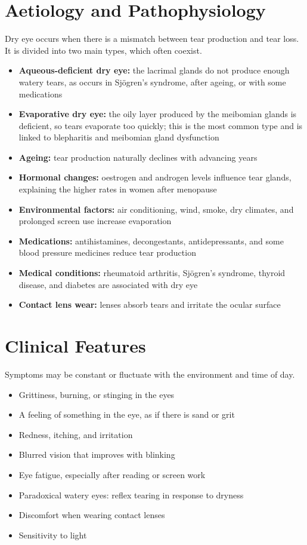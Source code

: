 \section*{Aetiology and Pathophysiology}
Dry eye occurs when there is a mismatch between tear production and tear loss. It is divided into two main types, which often coexist.
\begin{itemize}
    \item \textbf{Aqueous-deficient dry eye:} the lacrimal glands do not produce enough watery tears, as occurs in Sjögren's syndrome, after ageing, or with some medications
    \item \textbf{Evaporative dry eye:} the oily layer produced by the meibomian glands is deficient, so tears evaporate too quickly; this is the most common type and is linked to blepharitis and meibomian gland dysfunction
    \item \textbf{Ageing:} tear production naturally declines with advancing years
    \item \textbf{Hormonal changes:} oestrogen and androgen levels influence tear glands, explaining the higher rates in women after menopause
    \item \textbf{Environmental factors:} air conditioning, wind, smoke, dry climates, and prolonged screen use increase evaporation
    \item \textbf{Medications:} antihistamines, decongestants, antidepressants, and some blood pressure medicines reduce tear production
    \item \textbf{Medical conditions:} rheumatoid arthritis, Sjögren's syndrome, thyroid disease, and diabetes are associated with dry eye
    \item \textbf{Contact lens wear:} lenses absorb tears and irritate the ocular surface
\end{itemize}

\section*{Clinical Features}
Symptoms may be constant or fluctuate with the environment and time of day.
\begin{itemize}
    \item Grittiness, burning, or stinging in the eyes
    \item A feeling of something in the eye, as if there is sand or grit
    \item Redness, itching, and irritation
    \item Blurred vision that improves with blinking
    \item Eye fatigue, especially after reading or screen work
    \item Paradoxical watery eyes: reflex tearing in response to dryness
    \item Discomfort when wearing contact lenses
    \item Sensitivity to light
\end{itemize}

